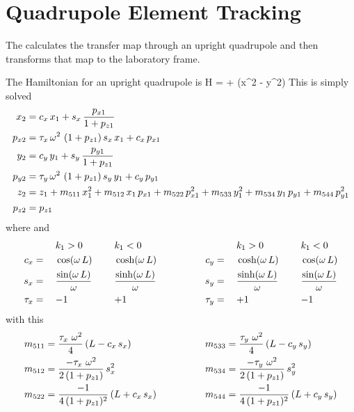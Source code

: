 \section{Quadrupole Element Tracking}
\label{s:quadrupole.std}

The  calculates the transfer map through an upright
quadrupole and then transforms that map to the laboratory frame.

The Hamiltonian for an upright quadrupole is
\Begineq
  H =  +  (x^2 - y^2)
\Endeq
This is simply solved
\begin{align}
  x_2    &= c_x \, x_1 + s_x \, \frac{p_{x1}}{1 + p_{z1}} \nonumber \\
  p_{x2} &= \tau_x \, \omega^2 \, \, (1 + p_{z1}) \, s_x \, x_1 + c_x \, p_{x1} \nonumber \\
  y_2    &= c_y \, y_1 + s_y \, \frac{p_{y1}}{1 + p_{z1}} \nonumber \\
  p_{y2} &= \tau_y \, \omega^2 \, \, (1 + p_{z1}) \, s_y \, y_1 + c_y \, p_{y1} \\
  z_2    &= z_1 + m_{511} \, x_1^2 + m_{512} \, x_1 \, p_{x1} + m_{522} \, p_{x1}^2 + 
                   m_{533} \, y_1^2 + m_{534} \, y_1 \, p_{y1} + m_{544} \, p_{y1}^2 \nonumber \\
  p_{z2} &= p_{z1} \nonumber
\end{align}
where 
\Begineq
  \om \equiv {}
\Endeq
and
\begin{alignat}{6}
         &\hspace*{3ex}  && k_1 > 0          &\hspace*{3ex}& k_1 < 0 & \qquad \qquad
         &\hspace*{3ex}  && k_1 > 0          &\hspace*{3ex}& k_1 < 0 \nonumber \\
     c_x &=   && \cos  (\omega \, L) && \cosh (\omega \, L) & \qquad \qquad
     c_y &=   && \cosh (\omega \, L) && \cos  (\omega \, L) \nonumber \\
     s_x &=   && \frac{\sin  (\omega \, L)}{\omega} && \frac{\sinh (\omega \, L)}{\omega} & \qquad \qquad
     s_y &=   && \frac{\sinh (\omega \, L)}{\omega} && \frac{\sin  (\omega \, L)}{\omega} \\
  \tau_x &=   && {-}1             && {+}1             & \qquad \qquad
  \tau_y &=   && {+}1             && {-}1             \nonumber
\end{alignat}
with this
\begin{alignat}{2}
  m_{511} &= \frac{\tau_x \,\, \omega^2}{4} \, (L - c_x \, s_x) & \qquad \qquad
  m_{533} &= \frac{\tau_y \,\, \omega^2}{4} \, (L - c_y \, s_y) \nonumber \\
  m_{512} &= \frac{-\tau_x \,\, \omega^2}{2 \, (1 + p_{z1})} \, s_x^2 & \qquad \qquad
  m_{534} &= \frac{-\tau_y \,\, \omega^2}{2 \, (1 + p_{z1})} \, s_y^2 \\
  m_{522} &= \frac{-1}{4 \, (1 + p_{z1})^2} \, (L + c_x \, s_x) & \qquad \qquad
  m_{544} &= \frac{-1}{4 \, (1 + p_{z1})^2} \, (L + c_y \, s_y) \nonumber
\end{alignat}


